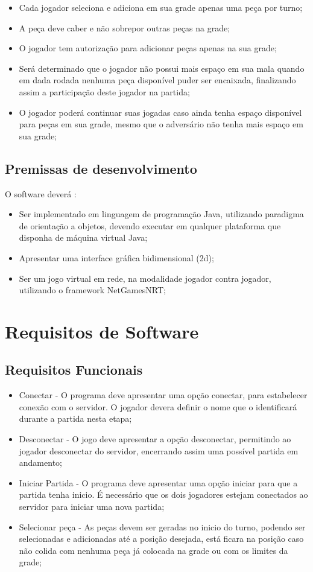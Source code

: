 \documentclass[
	12pt,	
	openany,			
	oneside,			
	a4paper,			
	english,			
	french,			
	spanish,			
	brazil,	
	]{abntex2}
\begin{document}
\begin{itemize}
\item Cada jogador seleciona e adiciona em sua grade apenas uma peça por turno;
\item A peça deve caber e não sobrepor outras peças na grade;
\item O jogador tem autorização para adicionar peças apenas na sua grade;
\item Será determinado que o jogador não possui mais espaço em sua mala quando em dada rodada nenhuma peça disponível puder ser encaixada, finalizando assim a participação deste jogador na partida;
\item O jogador poderá continuar suas jogadas caso ainda tenha espaço disponível para peças em sua grade, mesmo que o adversário não tenha mais espaço em sua grade;
\end{itemize}

\section{Premissas de desenvolvimento}

O software deverá :

\begin{itemize}
\item Ser implementado em linguagem de programação Java, utilizando paradigma de orientação a objetos, devendo executar em qualquer plataforma que disponha de máquina virtual Java;
\item Apresentar uma interface gráfica bidimensional (2d);
\item Ser um jogo virtual em rede, na modalidade jogador contra jogador, utilizando o framework NetGamesNRT;
\end{itemize}

\chapter{Requisitos de Software}

\section{Requisitos Funcionais}
\begin{itemize}
\item Conectar - O programa deve apresentar uma opção conectar, para estabelecer conexão com o servidor. O jogador devera definir o nome que o identificará durante a partida nesta etapa;
\item Desconectar - O jogo deve apresentar a opção desconectar, permitindo ao jogador desconectar do servidor, encerrando assim uma possível partida em andamento;
\item Iniciar Partida - O programa deve apresentar uma opção iniciar para que a partida tenha inicio. É necessário que os dois jogadores estejam conectados ao servidor para iniciar uma nova partida;
\item Selecionar peça - As peças devem ser geradas no inicio do turno, podendo ser selecionadas e adicionadas até a posição desejada, está ficara na posição caso não colida com nenhuma peça já colocada na grade ou com os limites da grade;
\end{itemize}
\end{document}
